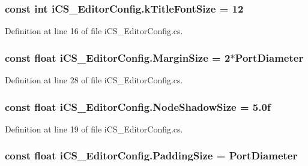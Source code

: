 \hypertarget{classi_c_s___editor_config_a25a0e526127b3055587db1fa518b6574}{
\subsubsection[{k\+Title\+Font\+Size}]{\setlength{\rightskip}{0pt plus 5cm}const int i\+C\+S\+\_\+\+Editor\+Config.\+k\+Title\+Font\+Size = 12}}\label{classi_c_s___editor_config_a25a0e526127b3055587db1fa518b6574}


Definition at line 16 of file i\+C\+S\+\_\+\+Editor\+Config.\+cs.

\hypertarget{classi_c_s___editor_config_abaddcfa3ae1e2f0ba89ecf284ab14365}{
\subsubsection[{Margin\+Size}]{\setlength{\rightskip}{0pt plus 5cm}const float i\+C\+S\+\_\+\+Editor\+Config.\+Margin\+Size = 2$\ast${\bf Port\+Diameter}}}\label{classi_c_s___editor_config_abaddcfa3ae1e2f0ba89ecf284ab14365}


Definition at line 28 of file i\+C\+S\+\_\+\+Editor\+Config.\+cs.

\hypertarget{classi_c_s___editor_config_ad21bac32ea6da241cd281a99a4a90b2c}{
\subsubsection[{Node\+Shadow\+Size}]{\setlength{\rightskip}{0pt plus 5cm}const float i\+C\+S\+\_\+\+Editor\+Config.\+Node\+Shadow\+Size = 5.\+0f}}\label{classi_c_s___editor_config_ad21bac32ea6da241cd281a99a4a90b2c}


Definition at line 19 of file i\+C\+S\+\_\+\+Editor\+Config.\+cs.

\hypertarget{classi_c_s___editor_config_ad047795d30cd3a4ad9deadef5cd03071}{
\subsubsection[{Padding\+Size}]{\setlength{\rightskip}{0pt plus 5cm}const float i\+C\+S\+\_\+\+Editor\+Config.\+Padding\+Size = {\bf Port\+Diameter}}}\label{classi_c_s___editor_config_ad047795d30cd3a4ad9deadef5cd03071}


